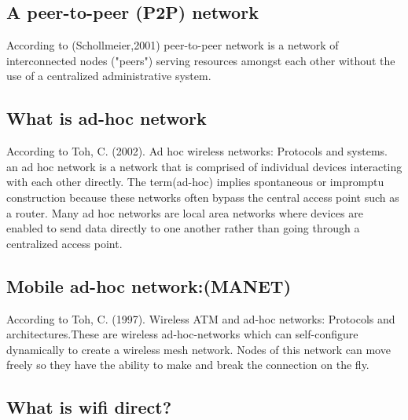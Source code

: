 \subsection{A peer-to-peer (P2P) network }
\vspace{12pt}

 According to (Schollmeier,2001)\cite{define_P_to_p} peer-to-peer network is a network of interconnected nodes ("peers") serving resources amongst each other without the use of a centralized administrative system.


\vspace{12pt}
\subsection{What is ad-hoc network}




\vspace{12pt}

According to Toh, C. (2002). Ad hoc wireless networks: Protocols and systems.  \cite{book_adhoc} an ad hoc network is a network that is comprised of individual devices interacting with each other directly. The term(ad-hoc) implies spontaneous or impromptu construction because these networks often bypass the central access point such as a router. Many ad hoc networks are local area networks where devices are enabled to send data directly to one another rather than going through a centralized access point.


\vspace{12pt}

\subsection{Mobile ad-hoc network:(MANET)}
\vspace{12pt}

According to Toh, C. (1997). Wireless ATM and ad-hoc networks: Protocols and architectures.\cite{book}These are wireless ad-hoc-networks which can self-configure dynamically to create a wireless mesh network. Nodes of this network can move freely so they have the ability to make and break the connection on the fly.


\vspace{12pt}
\subsection{What is wifi direct?}



